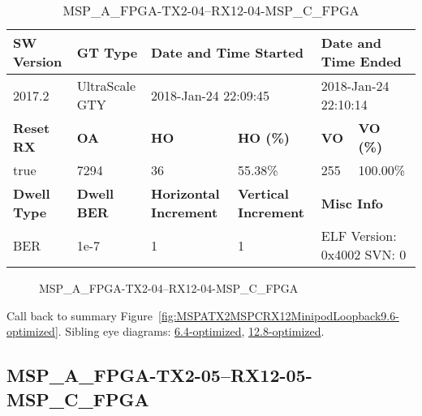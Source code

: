 \begin{table}[h]
\centering
\caption{MSP\_A\_FPGA-TX2-04--RX12-04-MSP\_C\_FPGA}
\label{tab:MSPAFPGATX204RX1204MSPCFPGA9.6-optimized}
\begin{tabular}{@{}|l|l|l|l|l|l|@{}}
\toprule
\textbf{SW Version}                & \textbf{GT Type}   & \multicolumn{2}{l|}{\textbf{Date and Time Started}}            & \multicolumn{2}{l|}{\textbf{Date and Time Ended}}        \\ \midrule
2017.2                       & UltraScale GTY          & \multicolumn{2}{l|}{2018-Jan-24 22:09:45}                   & \multicolumn{2}{l|}{2018-Jan-24 22:10:14}               \\ \midrule
\textbf{Reset RX}                  & \textbf{OA} & \textbf{HO}   & \textbf{HO (\%)} & \textbf{VO} & \textbf{VO (\%)} \\ \midrule
true & 7294        & 36          & 55.38\%        & 255        & 100.00\%       \\ \midrule
\textbf{Dwell Type}                & \textbf{Dwell BER} & \textbf{Horizontal Increment} & \textbf{Vertical Increment}    & \multicolumn{2}{l|}{\textbf{Misc Info}}                  \\ \midrule
BER                            & 1e-7        & 1        & 1           & \multicolumn{2}{l|}{ELF Version: 0x4002 SVN: 0}                         \\ \bottomrule
\end{tabular}
\end{table}

\begin{figure}[h]
\caption{MSP\_A\_FPGA-TX2-04--RX12-04-MSP\_C\_FPGA} \label{fig:MSPAFPGATX204RX1204MSPCFPGA9.6-optimized}
\end{figure}

Call back to summary Figure~\ref{fig:MSPATX2MSPCRX12MinipodLoopback9.6-optimized}.
Sibling eye diagrams: \hyperref[sec:MSPAFPGATX204RX1204MSPCFPGA6.4-optimized]{6.4-optimized}, \hyperref[sec:MSPAFPGATX204RX1204MSPCFPGA12.8-optimized]{12.8-optimized}.

\clearpage
\newpage


\subsection{MSP\_A\_FPGA-TX2-05--RX12-05-MSP\_C\_FPGA}\label{sec:MSPAFPGATX205RX1205MSPCFPGA9.6-optimized}

